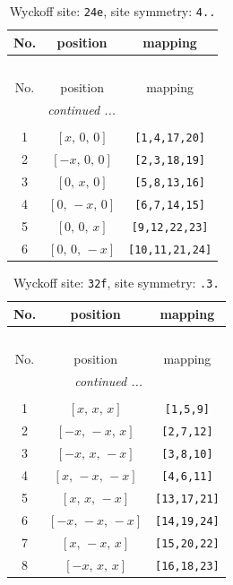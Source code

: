 \documentclass[fleqn,8pt]{jsarticle}
\begin{document}
\renewcommand{\arraystretch}{1.2}
\begin{longtable}{ccc}
\caption{Wyckoff site: {\tt 24e}, site symmetry: {\tt 4..}}
 \\
 \hline \hline
No. & position & mapping \\ \hline \endfirsthead

\multicolumn{2}{l}{\tablename\ \thetable{}} \\
 \hline \hline
No. & position & mapping \\ \hline \endhead

 \hline \hline
\multicolumn{2}{r}{\footnotesize\it continued ...} \\ \endfoot

 \hline \hline
\multicolumn{2}{r}{} \\ \endlastfoot

1 & $\left[ x,\, 0,\, 0 \right]$ & {\tt [1,4,17,20]} \\ \hline
2 & $\left[ - x,\, 0,\, 0 \right]$ & {\tt [2,3,18,19]} \\ \hline
3 & $\left[ 0,\, x,\, 0 \right]$ & {\tt [5,8,13,16]} \\ \hline
4 & $\left[ 0,\, - x,\, 0 \right]$ & {\tt [6,7,14,15]} \\ \hline
5 & $\left[ 0,\, 0,\, x \right]$ & {\tt [9,12,22,23]} \\ \hline
6 & $\left[ 0,\, 0,\, - x \right]$ & {\tt [10,11,21,24]} \\
\end{longtable}
\renewcommand{\arraystretch}{1.2}
\begin{longtable}{ccc}
\caption{Wyckoff site: {\tt 32f}, site symmetry: {\tt .3.}}
 \\
 \hline \hline
No. & position & mapping \\ \hline \endfirsthead

\multicolumn{2}{l}{\tablename\ \thetable{}} \\
 \hline \hline
No. & position & mapping \\ \hline \endhead

 \hline \hline
\multicolumn{2}{r}{\footnotesize\it continued ...} \\ \endfoot

 \hline \hline
\multicolumn{2}{r}{} \\ \endlastfoot

1 & $\left[ x,\, x,\, x \right]$ & {\tt [1,5,9]} \\ \hline
2 & $\left[ - x,\, - x,\, x \right]$ & {\tt [2,7,12]} \\ \hline
3 & $\left[ - x,\, x,\, - x \right]$ & {\tt [3,8,10]} \\ \hline
4 & $\left[ x,\, - x,\, - x \right]$ & {\tt [4,6,11]} \\ \hline
5 & $\left[ x,\, x,\, - x \right]$ & {\tt [13,17,21]} \\ \hline
6 & $\left[ - x,\, - x,\, - x \right]$ & {\tt [14,19,24]} \\ \hline
7 & $\left[ x,\, - x,\, x \right]$ & {\tt [15,20,22]} \\ \hline
8 & $\left[ - x,\, x,\, x \right]$ & {\tt [16,18,23]} \\
\end{longtable}
\end{document}
